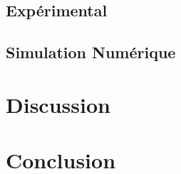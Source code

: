 \documentclass[14pt]{extarticle}
\begin{document}
\subsection{Expérimental}


\subsection{Simulation Numérique}


\section{Discussion}


\section{Conclusion}



\clearpage  %


\end{document}
